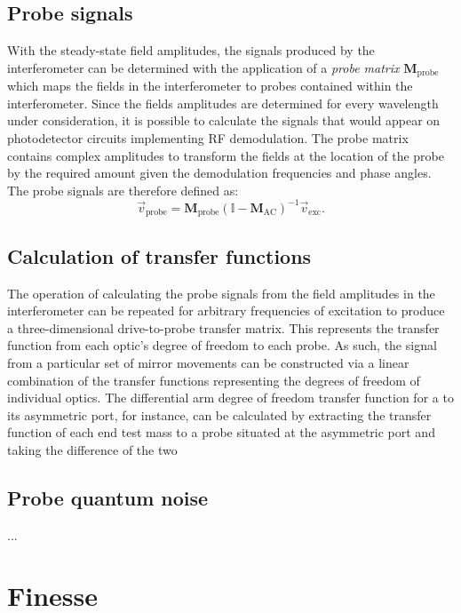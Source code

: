 \subsection{Probe signals}
With the steady-state field amplitudes, the signals produced by the interferometer can be determined with the application of a \emph{probe matrix} $\mathbf{M}_{\text{probe}}$ which maps the fields in the interferometer to probes contained within the interferometer. Since the fields amplitudes are determined for every wavelength under consideration, it is possible to calculate the signals that would appear on photodetector circuits implementing \gls{RF} demodulation. The probe matrix contains complex amplitudes to transform the fields at the location of the probe by the required amount given the demodulation frequencies and phase angles. The probe signals are therefore defined as:
\begin{equation}
  \vec{v}_{\text{probe}} = \mathbf{M}_{\text{probe}} \left( \mathbb{I} - \mathbf{M}_{\text{AC}} \right)^{-1} \vec{v}_{\text{exc}}.
\end{equation}

\subsection{Calculation of transfer functions}
The operation of calculating the probe signals from the field amplitudes in the interferometer can be repeated for arbitrary frequencies of excitation to produce a three-dimensional drive-to-probe transfer matrix. This represents the transfer function from each optic's degree of freedom to each probe. As such, the signal from a particular set of mirror movements can be constructed via a linear combination of the transfer functions representing the degrees of freedom of individual optics. The differential arm degree of freedom transfer function for a \MI{} to its asymmetric port, for instance, can be calculated by extracting the transfer function of each end test mass to a probe situated at the asymmetric port and taking the difference of the two 

\subsection{Probe quantum noise}
...

\section{\label{sec:finesse-sim}Finesse}

